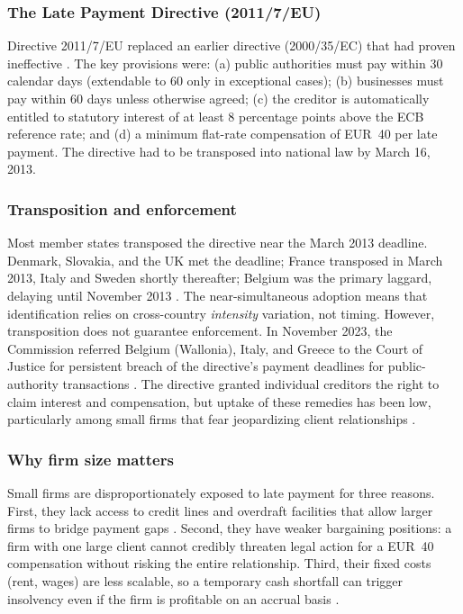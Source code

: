 \documentclass[12pt]{article}
\begin{document}
\subsubsection*{The Late Payment Directive (2011/7/EU)} Directive 2011/7/EU replaced an earlier directive (2000/35/EC) that had proven ineffective \citep{EUDirective2011}. The key provisions were: (a) public authorities must pay within 30 calendar days (extendable to 60 only in exceptional cases); (b) businesses must pay within 60 days unless otherwise agreed; (c) the creditor is automatically entitled to statutory interest of at least 8 percentage points above the ECB reference rate; and (d) a minimum flat-rate compensation of EUR~40 per late payment. The directive had to be transposed into national law by March 16, 2013.

\subsubsection*{Transposition and enforcement} Most member states transposed the directive near the March 2013 deadline. Denmark, Slovakia, and the UK met the deadline; France transposed in March 2013, Italy and Sweden shortly thereafter; Belgium was the primary laggard, delaying until November 2013 \citep{EuropeanCommission2016}. The near-simultaneous adoption means that identification relies on cross-country \emph{intensity} variation, not timing. However, transposition does not guarantee enforcement. In November 2023, the Commission referred Belgium (Wallonia), Italy, and Greece to the Court of Justice for persistent breach of the directive's payment deadlines for public-authority transactions \citep{EuropeanCommission2023}. The directive granted individual creditors the right to claim interest and compensation, but uptake of these remedies has been low, particularly among small firms that fear jeopardizing client relationships \citep{Connell2014}.

\subsubsection*{Why firm size matters} Small firms are disproportionately exposed to late payment for three reasons. First, they lack access to credit lines and overdraft facilities that allow larger firms to bridge payment gaps \citep{Petersen1997}. Second, they have weaker bargaining positions: a firm with one large client cannot credibly threaten legal action for a EUR~40 compensation without risking the entire relationship. Third, their fixed costs (rent, wages) are less scalable, so a temporary cash shortfall can trigger insolvency even if the firm is profitable on an accrual basis \citep{Klapper2006}.
\end{document}
